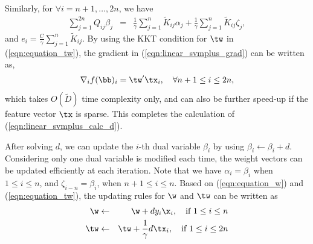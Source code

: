Similarly,  for  $\forall i = n+1, \ldots, 2n$, we have
\begin{eqnarray}
\sum_{j=1}^{2n}Q_{ij}\beta_j &=& \frac{1}{\gamma}\sum_{j=1}^n\tilde{K}_{ij}\alpha_j + \frac{1}{\gamma}\sum_{j=1}^n\tilde{K}_{ij}\zeta_j,\nonumber
\end{eqnarray}
and $e_i = \frac{C}{\gamma}\sum_{j=1}^n\tilde{K}_{ij}$. By using the KKT condition for $\tw$ in (\ref{eqn:equation_tw}), the gradient in (\ref{eqn:linear_svmplus_grad}) can be written as,
\begin{eqnarray}\label{eqn:linear_svmplus_grad_02}
\nabla_if(\bb)_i = \tw'\tx_i,\quad \forall n+1\leq i \leq 2n,
\end{eqnarray}
which takes $O(\tilde{D})$ time complexity only, and can also be further speed-up if the feature vector $\tx$ is sparse. This completes the calculation of (\ref{eqn:linear_svmplus_calc_d}).

After solving $d$, we can update the $i$-th dual variable $\beta_i$ by using $\beta_i\leftarrow \beta_i + d$. Considering only one dual variable is modified each time, the weight vectors can be updated efficiently at each iteration. Note that we have $\alpha_i = \beta_i$ when $1\leq i\leq n$, and $\zeta_{i-n} = \beta_{i}$, when $n+1\leq i \leq n$. Based on (\ref{eqn:equation_w}) and (\ref{eqn:equation_tw}), the updating rules for $\w$ and $\tw$ can be written as
\begin{eqnarray}
\w  &\leftarrow& \w + dy_i\x_i, \quad \mbox{if\,\,} 1\leq i \leq n\label{enq:update_w}\\
\tw  &\leftarrow& \tw + \frac{1}{\gamma}d\tx_i,\quad \mbox{if\,\,} 1\leq i \leq 2n\label{enq:update_tw}
\end{eqnarray}

